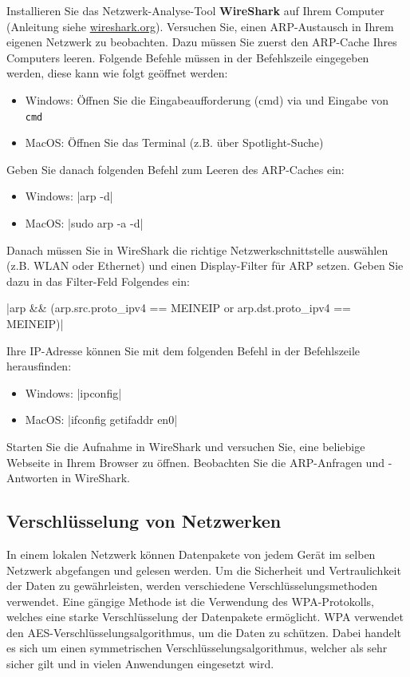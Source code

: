 \begin{mychallenge}
	Installieren Sie das Netzwerk-Analyse-Tool \textbf{WireShark} auf Ihrem Computer (Anleitung siehe \href{https://www.wireshark.org/download.html}{wireshark.org}). Versuchen Sie, einen \gls{ARP}-Austausch in Ihrem eigenen Netzwerk zu beobachten. Dazu müssen Sie zuerst den \gls{ARP}-Cache Ihres Computers leeren. Folgende Befehle müssen in der Befehlszeile eingegeben werden, diese kann wie folgt geöffnet werden:

	\begin{itemize}
		\item Windows: Öffnen Sie die Eingabeaufforderung (cmd) via  und Eingabe von \texttt{cmd}
		\item MacOS: Öffnen Sie das Terminal (z.B. über Spotlight-Suche)
	\end{itemize}

	Geben Sie danach folgenden Befehl zum Leeren des \gls{ARP}-Caches ein:
	\begin{itemize}
		\item Windows: \commandbox*|arp -d|
		\item MacOS: \commandbox*|sudo arp -a -d|
	\end{itemize}

	Danach müssen Sie in WireShark die richtige Netzwerkschnittstelle auswählen (z.B. WLAN oder Ethernet) und einen Display-Filter für \gls{ARP} setzen. Geben Sie dazu in das Filter-Feld Folgendes ein:

	\commandbox|arp && (arp.src.proto_ipv4 == MEINEIP or arp.dst.proto_ipv4 == MEINEIP)|

	Ihre \gls{IP}-Adresse können Sie mit dem folgenden Befehl in der Befehlszeile herausfinden:

	\begin{itemize}
		\item Windows: \commandbox*|ipconfig|
		\item MacOS: \commandbox*|ifconfig getifaddr en0|
	\end{itemize}

	Starten Sie die Aufnahme in WireShark und versuchen Sie, eine beliebige Webseite in Ihrem Browser zu öffnen. Beobachten Sie die \gls{ARP}-Anfragen und -Antworten in WireShark.
\end{mychallenge}

\subsection{Verschlüsselung von Netzwerken}
In einem lokalen Netzwerk können Datenpakete von jedem Gerät im selben Netzwerk abgefangen und gelesen werden. Um die Sicherheit und Vertraulichkeit der Daten zu gewährleisten, werden verschiedene Verschlüsselungsmethoden verwendet. Eine gängige Methode ist die Verwendung des \gls{WPA}-Protokolls, welches eine starke Verschlüsselung der Datenpakete ermöglicht. \gls{WPA} verwendet den \gls{AES}-Verschlüsselungsalgorithmus, um die Daten zu schützen. Dabei handelt es sich um einen symmetrischen Verschlüsselungsalgorithmus, welcher als sehr sicher gilt und in vielen Anwendungen eingesetzt wird.


